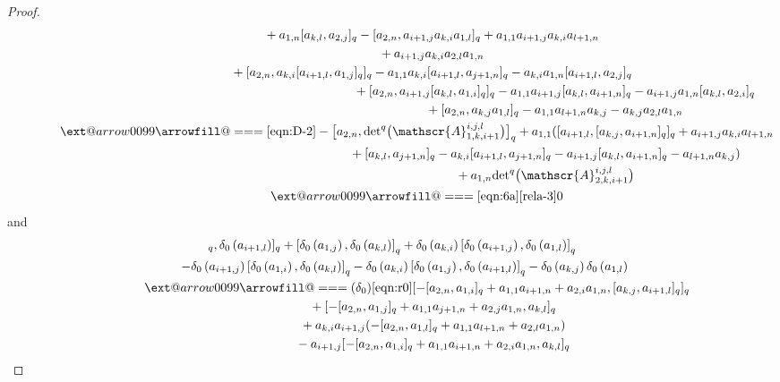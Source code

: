 \documentclass[10pt,a4paper]{amsart}
\makeatletter
\def\x@arrow{\DOTSB\Relbar}
\def\xlongequalsignfill@{\arrowfill@\x@arrow\Relbar\x@arrow}
\providecommand{\xlongequal}[2][]{%
	\ext@arrow 0099\xlongequalsignfill@{#1}{#2}}
\numberwithin{equation}{section}
\def\lr#1{\left[#1\right]}
\def\lrb#1{\left(#1\right)}
\def\d{\delta}
\def\A{\mathscr{A}}
\makeatother
\begin{document}
\begin{proof}
\begin{gather*}
 \phantom{\qquad\qquad \qquad\ }{} +a_{1,n} [a_{k,l}, a_{2,j} ]_q - [a_{2,n},a_{i+1,j}a_{k,i}a_{1,l} ]_q +a_{1,1}a_{i+1,j}a_{k,i}a_{l+1,n} \\
 \phantom{\qquad\qquad \qquad\ }{}
 +a_{i+1,j}a_{k,i}a_{2,l}a_{1,n} \\
 \phantom{\qquad\qquad \qquad\ }{} + [a_{2,n},a_{k,i} [a_{i+1,l},a_{1,j} ]_q ]_q-a_{1,1}a_{k,i} [a_{i+1,l}, a_{j+1,n} ]_q -a_{k,i}a_{1,n} [a_{i+1,l},a_{2,j} ]_q\\
 \phantom{\qquad\qquad \xlongequal{\eqref{equ:comm2}} }{} + [a_{2,n},a_{i+1,j} [a_{k,l},a_{1,i} ]_q ]_q -a_{1,1}a_{i+1,j} [a_{k,l},a_{i+1,n} ]_q -a_{i+1,j}a_{1,n} [a_{k,l},a_{2,i} ]_q \\
 \phantom{\qquad\qquad \xlongequal{\eqref{equ:comm2}} }{}+ [a_{2,n},a_{k,j}a_{1,l} ]_q-a_{1,1}a_{l+1,n}a_{k,j}-a_{k,j}a_{2,l}a_{1,n}\\
 \qquad\qquad \xlongequal{\eqref{eqn:D-2}} - \bigl[a_{2,n},{\det}^q \bigl(\A_{1,k,i+1}^{i,j,l} \bigr) \bigr]_q +a_{1,1} ( [a_{i+1,l}, [a_{k,j}, a_{i+1,n} ]_q ]_q +a_{i+1,j}a_{k,i}a_{l+1,n} \\
 \phantom{\qquad\qquad \xlongequal{\eqref{eqn:D-2}}}{} + [a_{k,l},a_{j+1,n} ]_q-a_{k,i} [a_{i+1,l}, a_{j+1,n} ]_q -a_{i+1,j} [a_{k,l},a_{i+1,n} ]_q -a_{l+1,n}a_{k,j} )\\
 \phantom{\qquad\qquad \xlongequal{\eqref{eqn:D-2}}}{}+a_{1,n}{\det}^q \bigl(\A_{2,k,i+1}^{i,j,l} \bigr)\\
\qquad\qquad \xlongequal[\eqref{eqn:6a}]{\eqref{rela-3}} 0
\end{gather*}
and
\begin{gather*}
 [\lr{\d_0\lrb{a_{1,i}}, \d_0\lrb{a_{k,j}}}_q, \d_0\lrb{a_{i+1,l}}]_q+ \lr{\d_0\lrb{a_{1,j}}, \d_0\lrb{a_{k,l}}}_q +\d_0\lrb{a_{k,i}}\lr{\d_0\lrb{a_{i+1,j}}, \d_0\lrb{a_{1,l}}}_q \\
 \qquad -\d_0\lrb{a_{i+1,j}}\lr{\d_0\lrb{a_{1,i}}, \d_0\lrb{a_{k,l}}}_q -\d_0\lrb{a_{k,i}}\lr{\d_0\lrb{a_{1,j}}, \d_0\lrb{a_{i+1,l}}}_q-\d_0\lrb{a_{k,j}} \d_0\lrb{a_{1,l}}\\
 \qquad\qquad\xlongequal[(\d_0)]{\eqref{eqn:r0}} [ - [a_{2,n},a_{1,i} ]_q +a_{1,1}a_{i+1,n}+a_{2,i}a_{1,n}, [a_{k,j}, a_{i+1,l} ]_q ]_q\\
\phantom{\qquad\qquad\qquad\ \,}{} + [ - [a_{2,n},a_{1,j} ]_q+a_{1,1}a_{j+1,n}+a_{2,j}a_{1,n}, a_{k,l} ]_q \\
\phantom{\qquad\qquad\qquad\ \,}{} +a_{k,i}a_{i+1,j} (- [a_{2,n},a_{1,l} ]_q+a_{1,1}a_{l+1,n}+a_{2,l}a_{1,n} ) \\
 \phantom{\qquad\qquad\qquad\ \,}{} -a_{i+1,j} [ - [a_{2,n},a_{1,i} ]_q+a_{1,1}a_{i+1,n}+a_{2,i}a_{1,n}, a_{k,l} ]_q \\

\end{gather*}
\end{proof}
\end{document}
